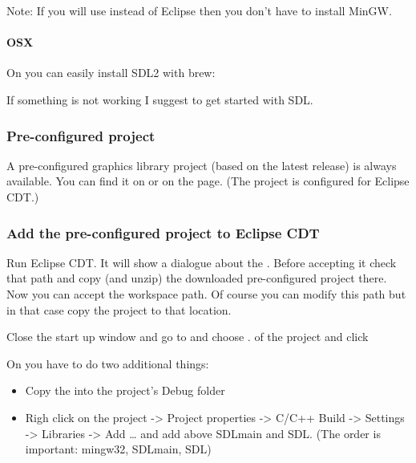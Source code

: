 \documentclass[letterpaper,10pt,english]{sphinxmanual}
\begin{document}
Note: If you will use  instead of Eclipse then you don’t have to install MinGW.


\paragraph{OSX}
\label{\detokenize{get-started/pc-simulator:osx}}
On  you can easily install SDL2 with brew: 

If something is not working I suggest  to get started with SDL.


\subsubsection{Pre-configured project}
\label{\detokenize{get-started/pc-simulator:pre-configured-project}}
A pre-configured graphics library project (based on the latest release) is always available.
You can find it on  or on the  page.
(The project is configured for Eclipse CDT.)


\subsubsection{Add the pre-configured project to Eclipse CDT}
\label{\detokenize{get-started/pc-simulator:add-the-pre-configured-project-to-eclipse-cdt}}
Run Eclipse CDT. It will show a dialogue about the . Before accepting it check that path and copy (and unzip) the downloaded pre-configured project there. Now you can accept the workspace path. Of course you can modify this path but in that case copy the project to that location.

Close the start up window and go to  and choose .  of the project and click 

On  you have to do two additional things:
\begin{itemize}
\item {} 
Copy the  into the project’s Debug folder

\item {} 
Righ click on the project -\textgreater{} Project properties -\textgreater{} C/C++ Build -\textgreater{} Settings -\textgreater{} Libraries -\textgreater{} Add … and add  above SDLmain and SDL. (The order is important: mingw32, SDLmain, SDL)

\end{itemize}
\end{document}
